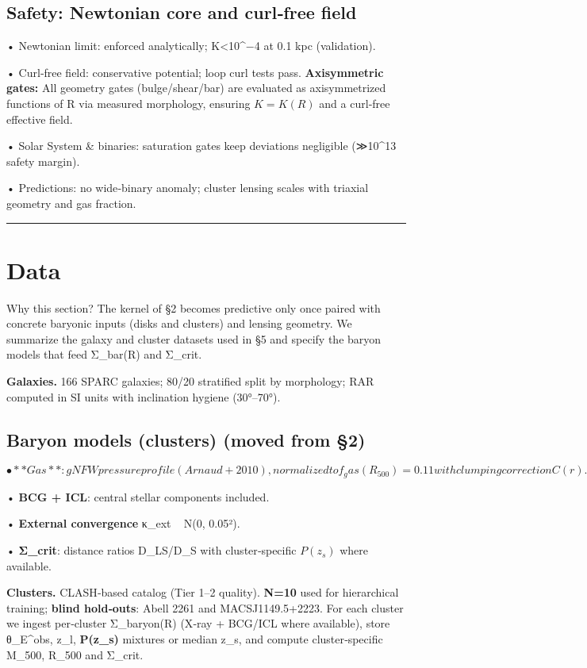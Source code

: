 \documentclass[11pt,a4paper]{article}
\begin{document}
\subsection{Safety: Newtonian core and curl‑free field}


• Newtonian limit: enforced analytically; K<10^−4 at 0.1 kpc (validation).  

• Curl‑free field: conservative potential; loop curl tests pass. \textbf{Axisymmetric gates:} All geometry gates (bulge/shear/bar) are evaluated as axisymmetrized functions of R via measured morphology, ensuring $K=K(R)$ and a curl‑free effective field.  

• Solar System \& binaries: saturation gates keep deviations negligible (≫10^13 safety margin).  

• Predictions: no wide‑binary anomaly; cluster lensing scales with triaxial geometry and gas fraction.



\medskip\hrule\medskip


\section{Data}


Why this section? The kernel of §2 becomes predictive only once paired with concrete baryonic inputs (disks and clusters) and lensing geometry. We summarize the galaxy and cluster datasets used in §5 and specify the baryon models that feed Σ\_bar(R) and Σ\_crit.


\textbf{Galaxies.} 166 SPARC galaxies; 80/20 stratified split by morphology; RAR computed in SI units with inclination hygiene (30°–70°).


\subsection{Baryon models (clusters) (moved from §2)}


\[
• **Gas**: gNFW pressure profile (Arnaud+2010), normalized to f_gas(R_500)=0.11 with clumping correction C(r).
\]

• \textbf{BCG + ICL}: central stellar components included.  

• \textbf{External convergence} κ\_ext ~ N(0, 0.05²).  

• \textbf{Σ\_crit}: distance ratios D\_LS/D\_S with cluster‑specific $P(z_s)$ where available.


\textbf{Clusters.} CLASH‑based catalog (Tier 1–2 quality). \textbf{N=10} used for hierarchical training; \textbf{blind hold‑outs}: Abell 2261 and MACSJ1149.5+2223. For each cluster we ingest per‑cluster Σ\_baryon(R) (X‑ray + BCG/ICL where available), store {θ\_E^obs, z\_l, \textbf{P(z\_s)} mixtures or median z\_s}, and compute cluster‑specific M\_500, R\_500 and Σ\_crit.
\end{document}
